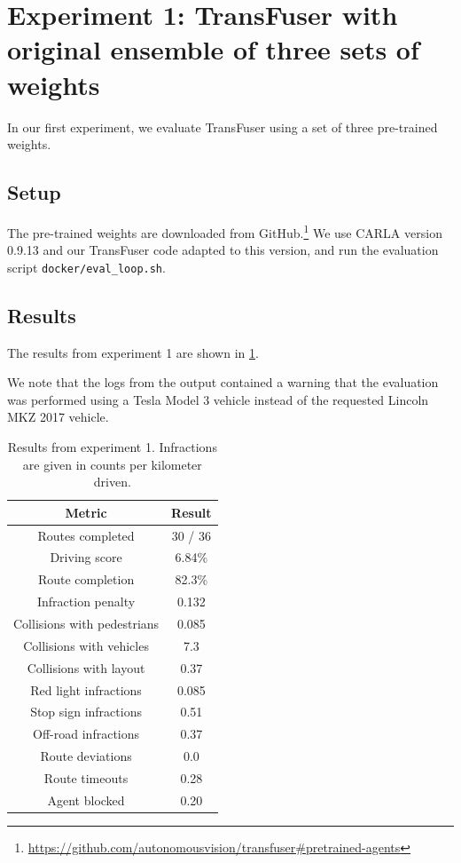 \section{Experiment 1: TransFuser with original ensemble of three sets of weights}
\label{sec:exp1}
In our first experiment, we evaluate TransFuser using a set of three pre-trained weights.

\subsection{Setup}
The pre-trained weights are downloaded from GitHub.\footnote{\url{https://github.com/autonomousvision/transfuser\#pretrained-agents}}
We use CARLA version 0.9.13 and our TransFuser code adapted to this version,
and run the evaluation script \texttt{docker/eval\_loop.sh}.


\subsection{Results}

The results from experiment 1 are shown in \cref{tab:exp1:results}.

We note that the logs from the output contained a warning that the evaluation was performed using a
Tesla Model 3 vehicle instead of the requested Lincoln MKZ 2017 vehicle.

\begin{table}[]
    \centering
    \begin{tabular}{|c|c|}
        \hline
        \textbf{Metric} & \textbf{Result} \\ \hline
        Routes completed & 30 / 36 \\ \hline
        Driving score & 6.84\% \\ \hline
        Route completion & 82.3\% \\ \hline
        Infraction penalty & 0.132 \\ \hline
        Collisions with pedestrians & 0.085 \\ \hline
        Collisions with vehicles & 7.3 \\ \hline
        Collisions with layout & 0.37 \\ \hline
        Red light infractions & 0.085 \\ \hline
        Stop sign infractions & 0.51 \\ \hline
        Off-road infractions & 0.37 \\ \hline
        Route deviations & 0.0 \\ \hline
        Route timeouts & 0.28 \\ \hline
        Agent blocked & 0.20 \\ \hline
    \end{tabular}
    \caption{Results from experiment 1. Infractions are given in counts per kilometer driven.}
    \label{tab:exp1:results}
\end{table}

